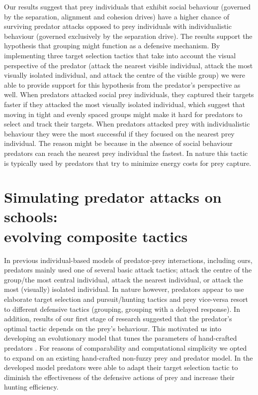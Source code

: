 Our results suggest that prey individuals that exhibit social behaviour (governed by the separation, alignment and cohesion drives) have a higher chance of surviving predator attacks opposed to prey individuals with individualistic behaviour (governed exclusively by the separation drive). The results support the hypothesis that grouping might function as a defensive mechanism. By implementing three target selection tactics that take into account the visual perspective of the predator (attack the nearest visible individual, attack the most visually isolated individual, and attack the centre of the visible group) we were able to provide support for this hypothesis from the predator's perspective as well. When predators attacked social prey individuals, they captured their targets faster if they attacked the most visually isolated individual, which suggest that moving in tight and evenly spaced groups might make it hard for predators to select and track their targets. When predators attacked prey with individualistic behaviour they were the most successful if they focused on the nearest prey individual. The reason might be because in the absence of social behaviour predators can reach the nearest prey individual the fastest. In nature this tactic is typically used by predators that try to minimize energy costs for prey capture.

\section[Simulating predator attacks on schools: evolving composite tactics]{Simulating predator attacks on schools:\\ evolving composite tactics}

In previous individual-based models of predator-prey interactions, including ours, predators mainly used one of several basic attack tactics; attack the centre of the group/the most central individual, attack the nearest individual, or attack the most (visually) isolated individual. In nature however, predators appear to use elaborate target selection and pursuit/hunting tactics \cite{cresswell2011predicting,forsman1998visual,gazda2005division,handegard2012dynamics,hector1986cooperative,kane2014falcons,lopez2006bottlenose,nottestad2002digging,rutz2012predator} and prey vice-versa resort to different defensive tactics (\eg grouping, grouping with a delayed response). In addition, results of our first stage of research suggested that the predator's optimal tactic depends on the prey's behaviour. This motivated us into developing an evolutionary model that tunes the parameters of hand-crafted predators \cite{demsar2015simulating}. For reasons of comparability and computational simplicity we opted to expand on an existing hand-crafted non-fuzzy prey and predator model. In the developed model predators were able to adapt their target selection tactic to diminish the effectiveness of the defensive actions of prey and increase their hunting efficiency.

